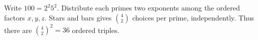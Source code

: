 Write $100=2^2 5^2$. Distribute each prime\textquotesingle s two exponents among the ordered factors $x,y,z$. Stars and bars gives $\binom42$ choices per prime, independently. Thus there are $\binom42^2=\boxed{36}$ ordered triples.
